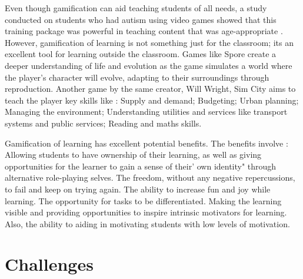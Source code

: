 \documentclass[sigchi]{acmart}
\begin{document}
Even though gamification can aid teaching students of all needs, a study conducted on students who had autism using video games showed that this training package was powerful in teaching content that was age-appropriate \cite{26}. However, gamification of learning is not something just for the classroom; its an excellent tool for learning outside the classroom. Games like Spore create a deeper understanding of life and evolution as the game simulates a world where the player's character will evolve, adapting to their surroundings through reproduction. Another game by the same creator, Will Wright, Sim City aims to teach the player key skills like \cite{27}: Supply and demand; Budgeting; Urban planning; Managing the environment; Understanding utilities and services like transport systems and public services; Reading and maths skills. 

Gamification of learning has excellent potential benefits. The benefits involve \cite{22}: Allowing students to have ownership of their learning, as well as giving opportunities for the learner to gain a sense of their' own identity" through alternative role-playing selves. The freedom, without any negative repercussions, to fail and keep on trying again. The ability to increase fun and joy while learning. The opportunity for tasks to be differentiated. Making the learning visible and providing opportunities to inspire intrinsic motivators for learning. Also, the ability to aiding in motivating students with low levels of motivation. 

\section{Challenges}
\end{document}
